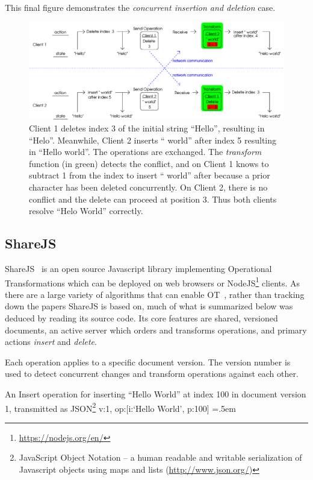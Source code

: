 \documentclass[12pt,a4paper,twoside,openright]{report}
\newenvironment{lcverbatim}
 {\SaveVerbatim{cverb}}
 {\endSaveVerbatim
  \flushleft\fboxrule=0pt\fboxsep=.5em
  \colorbox{cverbbg}{%
    \makebox[\dimexpr\linewidth-2\fboxsep][l]{\BUseVerbatim{cverb}}%
  }
  \endflushleft
}
\begin{document}
	This final figure demonstrates the \textit{concurrent insertion and deletion} case.
	
	\begin{figure}[H]
	\centering
	\includegraphics[width=1\linewidth]{figs/ot3.eps}
	\caption[Operational Transformations --- concurrent insertion and deletion]{Client 1 deletes index 3 of the initial string ``Hello'', resulting in ``Helo''. Meanwhile, Client 2 inserts `` world'' after index 5 resulting in ``Hello world''. The operations are exchanged. The \textit{transform} function (in green) detects the conflict, and on Client 1 knows to subtract 1 from the index to insert `` world'' after because a prior character has been deleted concurrently. On Client 2, there is no conflict and the delete can proceed at position 3. Thus both clients resolve ``Helo World'' correctly.}
	\label{fig:ot3}
	\end{figure}

	\subsection{ShareJS} \label{sec:sharejs}
	
	ShareJS~\cite{sharejs} is an open source Javascript library implementing Operational Transformations which can be deployed on web browsers or NodeJS\footnote{\url{https://nodejs.org/en/}} clients. As there are a large variety of algorithms that can enable OT~\cite{kumawat2016}, rather than tracking down the papers ShareJS is based on, much of what is summarized below was deduced by reading its source code. Its core features are shared, versioned documents, an active server which orders and transforms operations, and primary actions \textit{insert} and \textit{delete}.
	
	Each operation applies to a specific document version. The version number is used to detect concurrent changes and transform operations against each other.
	
	An Insert operation for inserting ``Hello World'' at index 100 in document version 1, transmitted as JSON\footnote{JavaScript Object Notation -- a human readable and writable serialization of Javascript objects using maps and lists (\url{http://www.json.org/})}
\begin{lcverbatim}
{v:1, op:[{i:`Hello World', p:100}]}
\end{lcverbatim}
\end{document}
